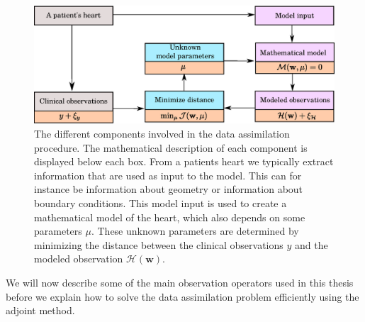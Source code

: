 \begin{figure}[htbp]
  \centering
    \includegraphics[width=\textwidth]{chapters/introduction/figures/data_assimilation.eps}
\caption{The different components involved in the data assimilation
  procedure. The mathematical description of each component is
  displayed below each box. From a patients heart we typically extract information
  that are used as input to the model. This can for instance be
  information about geometry or information about boundary
  conditions. This model input is used to create a mathematical model
  of the heart, which also depends on some parameters $\mu$.
  These unknown parameters are determined by minimizing the distance
  between the clinical observations $y$ and the modeled observation
  $\mathcal{H}(\mathbf{w})$.}
\label{fig:data_assimilation}
\end{figure}

We will now describe some of the main observation operators used in
this thesis before we explain how to solve the data assimilation
problem efficiently using the adjoint method. 


